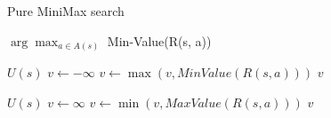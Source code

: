 \begin{algorithm}[H]
    \caption{Pure MiniMax search}
    \label{alg:minimax}
    \begin{algorithmic}[1]
    
        \State \Return $\arg\max_{a \in A(s)}$ Min-Value(R(s, a))
    \EndProcedure
    \end{algorithmic}

    \begin{algorithmic}[1]

            \Return $U(s)$
        \EndIf
        \State $v \leftarrow -\infty$
            \State $v \leftarrow \max(v, MinValue(R(s, a)))$
        \EndFor
        \State \Return $v$
    \EndProcedure
    
    \end{algorithmic}
        
    \begin{algorithmic}[1]

            \Return $U(s)$
        \EndIf
        \State $v \leftarrow \infty$
            \State $v \leftarrow \min(v, MaxValue(R(s, a)))$
        \EndFor
        \State \Return $v$
    \EndProcedure

    \end{algorithmic}
\end{algorithm}